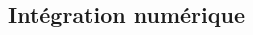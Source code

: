\documentclass[10pt,fleqn]{article} %
\begin{document}
%

%

%
%
\begin{multicols}{2}
\section{Intégration numérique}

\end{multicols}
\newpage

%
%
%
%
%
%
%
%
%
%
%
\end{document}
